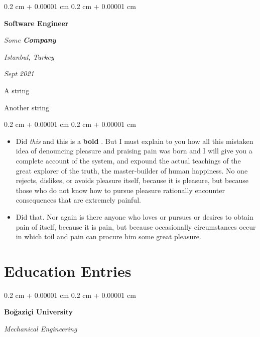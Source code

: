 \documentclass[10pt, letterpaper]{article}
\newenvironment{summary}{
    \begin{description}[
        topsep=0.10 cm,
        parsep=0.10 cm,
        partopsep=0pt,
        itemsep=0pt,
        leftmargin=0.4 cm + 10pt
    ]
}{
    \end{description}
} %
\newenvironment{highlights}{
    \begin{itemize}[
        topsep=0.10 cm,
        parsep=0.10 cm,
        partopsep=0pt,
        itemsep=0pt,
        leftmargin=0.4 cm + 10pt
    ]
}{
    \end{itemize}
} %
\newenvironment{onecolentry}{
    \begin{adjustwidth}{
        0.2 cm + 0.00001 cm
    }{
        0.2 cm + 0.00001 cm
    }
}{
    \end{adjustwidth}
} %
\newenvironment{twocolentry}[2][]{
    \onecolentry
    \def\secondColumn{#2}
    \setcolumnwidth{\fill, 4.5 cm}
    \begin{paracol}{2}
}{
    \switchcolumn \raggedleft \secondColumn
    \end{paracol}
    \endonecolentry
} %
\let\hrefWithoutArrow\href
\renewcommand{\href}[2]{\hrefWithoutArrow{#1}{\ifthenelse{\equal{#2}{}}{ }{#2 }\raisebox{.15ex}{\footnotesize \faExternalLink*}}}
\begin{document}
        \begin{twocolentry}{
        \textit{Istanbul, Turkey}    
            
        \textit{Sept 2021}}
            \textbf{Software Engineer}
            
            \textit{Some \textbf{Company}}
        \end{twocolentry}
            \begin{summary}
                \item A string
                \item Another string
            \end{summary}
        \vspace{0.10 cm}
        \begin{onecolentry}
            \begin{highlights}
                \item Did \textit{this} and this is a \textbf{bold} \href{https://example.com}{link}. But I must explain to you how all this mistaken idea of denouncing pleasure and praising pain was born and I will give you a complete account of the system, and expound the actual teachings of the great explorer of the truth, the master-builder of human happiness. No one rejects, dislikes, or avoids pleasure itself, because it is pleasure, but because those who do not know how to pursue pleasure rationally encounter consequences that are extremely painful.
                \item Did that. Nor again is there anyone who loves or pursues or desires to obtain pain of itself, because it is pain, but because occasionally circumstances occur in which toil and pain can procure him some great pleasure.
            \end{highlights}
        \end{onecolentry}



    
    \section{Education Entries}



        
        \begin{onecolentry}
            \textbf{Boğaziçi University}

            \textit{Mechanical Engineering}
        \end{onecolentry}


        \vspace{0.2 cm}
\end{document}
